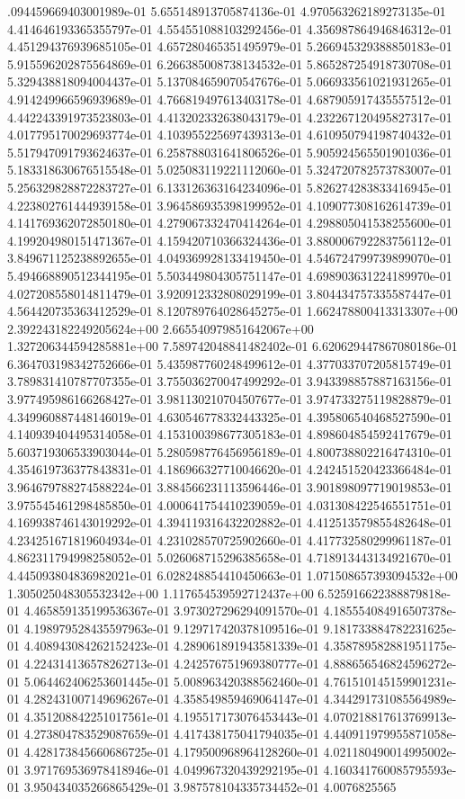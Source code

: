 .094459669403001989e-01	5.655148913705874136e-01	4.970563262189273135e-01	4.414646193365355797e-01	4.554551088103292456e-01	4.356987864946846312e-01	4.451294376939685105e-01	4.657280465351495979e-01	5.266945329388850183e-01	5.915596202875564869e-01	6.266385008738134532e-01	5.865287254918730708e-01	5.329438818094004437e-01	5.137084659070547676e-01	5.066933561021931265e-01	4.914249966596939689e-01	4.766819497613403178e-01	4.687905917435557512e-01	4.442243391973523803e-01	4.413202332638043179e-01	4.232267120495827317e-01	4.017795170029693774e-01	4.103955225697439313e-01	4.610950794198740432e-01	5.517947091793624637e-01	6.258788031641806526e-01	5.905924565501901036e-01	5.183318630676515548e-01	5.025083119221112060e-01	5.324720782573783007e-01	5.256329828872283727e-01	6.133126363164234096e-01	5.826274283833416945e-01	4.223802761444939158e-01	3.964586935398199952e-01	4.109077308162614739e-01	4.141769362072850180e-01	4.279067332470414264e-01	4.298805041538255600e-01	4.199204980151471367e-01	4.159420710366324436e-01	3.880006792283756112e-01	3.849671125238892655e-01	4.049369928133419450e-01	4.546724799739899070e-01	5.494668890512344195e-01	5.503449804305751147e-01	4.698903631224189970e-01	4.027208558014811479e-01	3.920912332808029199e-01	3.804434757335587447e-01	4.564420735363412529e-01	8.120789764028645275e-01	1.662478800413313307e+00	2.392243182249205624e+00	2.665540979851642067e+00	1.327206344594285881e+00	7.589742048841482402e-01	6.620629447867080186e-01	6.364703198342752666e-01	5.435987760248499612e-01	4.377033707205815749e-01	3.789831410787707355e-01	3.755036270047499292e-01	3.943398857887163156e-01	3.977495986166268427e-01	3.981130210704507677e-01	3.974733275119828879e-01	4.349960887448146019e-01	4.630546778332443325e-01	4.395806540468527590e-01	4.140939404495314058e-01	4.153100398677305183e-01	4.898604854592417679e-01	5.603719306533903044e-01	5.280598776456956189e-01	4.800738802216474310e-01	4.354619736377843831e-01	4.186966327710046620e-01	4.242451520423366484e-01	3.964679788274588224e-01	3.884566231113596446e-01	3.901898097719019853e-01	3.975545461298485850e-01	4.000641754410239059e-01	4.031308422546551751e-01	4.169938746143019292e-01	4.394119316432202882e-01	4.412513579855482648e-01	4.234251671819604934e-01	4.231028570725902660e-01	4.417732580299961187e-01	4.862311794998258052e-01	5.026068715296385658e-01	4.718913443134921670e-01	4.445093804836982021e-01	6.028248854410450663e-01	1.071508657393094532e+00	1.305025048305532342e+00	1.117654539592712437e+00	6.525916622388879818e-01	4.465859135199536367e-01	3.973027296294091570e-01	4.185554084916507378e-01	4.198979528435597963e-01	9.129717420378109516e-01	9.181733884782231625e-01	4.408943084262152423e-01	4.289061891943581339e-01	4.358789582881951175e-01	4.224314136578262713e-01	4.242576751969380777e-01	4.888656546824596272e-01	5.064462406253601445e-01	5.008963420388562460e-01	4.761510145159901231e-01	4.282431007149696267e-01	4.358549859469064147e-01	4.344291731085564989e-01	4.351208842251017561e-01	4.195517173076453443e-01	4.070218817613769913e-01	4.273804783529087659e-01	4.417438175041794035e-01	4.440911979955871058e-01	4.428173845660686725e-01	4.179500968964128260e-01	4.021180490014995002e-01	3.971769536978418946e-01	4.049967320439292195e-01	4.160341760085795593e-01	3.950434035266865429e-01	3.987578104335734452e-01	4.0076825565